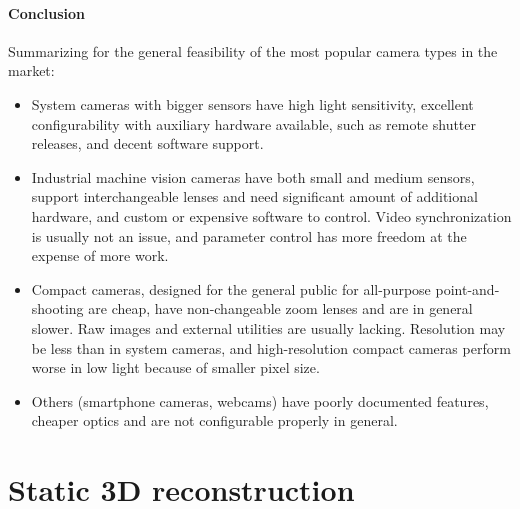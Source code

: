 
\paragraph{Conclusion}
Summarizing for the general feasibility of the most popular camera types in the market:

\begin{itemize}
	\item System cameras with bigger sensors have high light sensitivity, excellent configurability with auxiliary hardware available, such as remote shutter releases, and decent software support.
	\item Industrial machine vision cameras have both small and medium sensors, support interchangeable lenses and need significant amount of additional hardware, and custom or expensive software to control. Video synchronization is usually not an issue, and parameter control has more freedom at the expense of more work.
	\item Compact cameras, designed for the general public for all-purpose point-and-shooting are cheap, have non-changeable zoom lenses and are in general slower. Raw images and external utilities are usually lacking. Resolution may be less than in system cameras, and high-resolution compact cameras perform worse in low light because of smaller pixel size.
	\item Others (smartphone cameras, webcams) have poorly documented features, cheaper optics and are not configurable properly in general.
\end{itemize}



\clearpage
\section{Static 3D reconstruction} \label{sec:static3d} %

